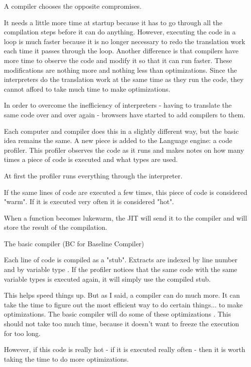 \documentclass{article}
\begin{document}
A compiler chooses the opposite compromises.

It needs a little more time at startup because it has to go through all the compilation steps before it can do anything. However, executing the code in a loop is much faster because it is no longer necessary to redo the translation work each time it passes through the loop.
Another difference is that compilers have more time to observe the code and modify it so that it can run faster. These modifications are nothing more and nothing less than optimizations. Since the interpreters do the translation work at the same time as they run the code, they cannot afford to take much time to make optimizations.


In order to overcome the inefficiency of interpreters - having to translate the same code over and over again - browsers have started to add compilers to them.

Each computer and compiler does this in a slightly different way, but the basic idea remains the same. A new piece is added to the Language engine: a code profiler. This profiler observes the code as it runs and makes notes on how many times a piece of code is executed and what types are used.

At first the profiler runs everything through the interpreter.

If the same lines of code are executed a few times, this piece of code is considered "warm". If it is executed very often it is considered "hot".

When a function becomes lukewarm, the JIT will send it to the compiler and will store the result of the compilation.

The basic compiler (BC for Baseline Compiler)

Each line of code is compiled as a "stub". Extracts are indexed by line number and by variable type . If the profiler notices that the same code with the same variable types is executed again, it will simply use the compiled stub.

This helps speed things up. But as I said, a compiler can do much more. It can take the time to figure out the most efficient way to do certain things... to make optimizations. The basic compiler will do some of these optimizations . This should not take too much time, because it doesn't want to freeze the execution for too long.

However, if this code is really hot - if it is executed really often - then it is worth taking the time to do more optimizations.
\end{document}
